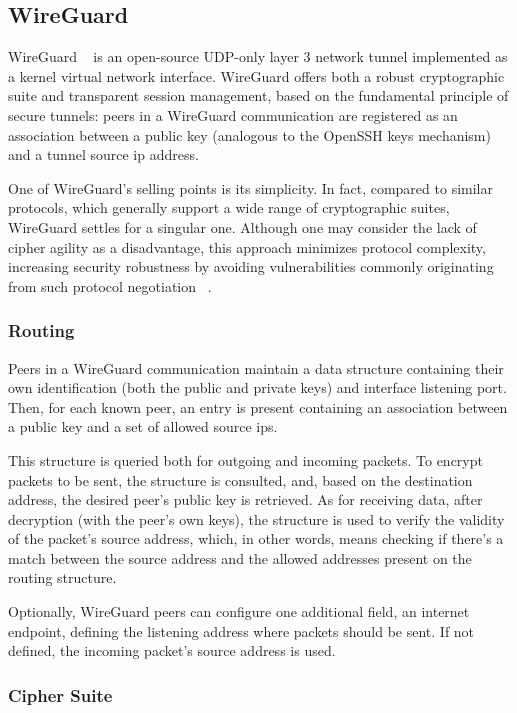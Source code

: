 \documentclass[11pt,twoside,a4paper]{report}
\begin{document}
\subsection{WireGuard}
\label{ss:wg}

WireGuard ~\cite{donenfeld2017wireguard} is an open-source UDP-only layer 3 network tunnel implemented as a kernel virtual network interface. WireGuard offers both a robust cryptographic suite and transparent session management, based on the fundamental principle of secure tunnels: peers in a WireGuard communication are registered as an association between a public key (analogous to the OpenSSH keys mechanism) and a tunnel source \ac{ip} address.

One of WireGuard's selling points is its simplicity. In fact, compared to similar protocols, which generally support a wide range of cryptographic suites, WireGuard settles for a singular one. Although one may consider the lack of cipher agility as a disadvantage, this approach minimizes protocol complexity, increasing security robustness by avoiding vulnerabilities commonly originating from such protocol negotiation ~\cite{curguz2016vulnerabilities}.

\subsubsection{Routing}

Peers in a WireGuard communication maintain a data structure containing their own identification (both the public and private keys) and interface listening port. Then, for each known peer, an entry is present containing an association between a public key and a set of allowed source \ac{ip}s.

This structure is queried both for outgoing and incoming packets. To encrypt packets to be sent, the structure is consulted, and, based on the destination address, the desired peer's public key is retrieved. As for receiving data, after decryption (with the peer's own keys), the structure is used to verify the validity of the packet's source address, which, in other words, means checking if there's a match between the source address and the allowed addresses present on the routing structure.

Optionally, WireGuard peers can configure one additional field, an internet endpoint, defining the listening address where packets should be sent. If not defined, the incoming packet's source address is used.

\subsubsection{Cipher Suite}
\end{document}
